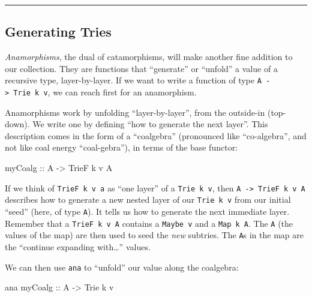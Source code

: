 \documentclass[]{article}
\newenvironment{Shaded}{}{}
\newcommand{\DataTypeTok}[1]{\textcolor[rgb]{0.56,0.13,0.00}{#1}}
\newcommand{\NormalTok}[1]{#1}
\newcommand{\OtherTok}[1]{\textcolor[rgb]{0.00,0.44,0.13}{#1}}
\begin{document}
\begin{center}\rule{0.5\linewidth}{\linethickness}\end{center}

\hypertarget{generating-tries}{%
\subsection{Generating Tries}\label{generating-tries}}

\emph{Anamorphisms}, the dual of catamorphisms, will make another fine addition
to our collection. They are functions that ``generate'' or ``unfold'' a value of
a recursive type, layer-by-layer. If we want to write a function of type
\texttt{A\ -\textgreater{}\ Trie\ k\ v}, we can reach first for an anamorphism.

Anamorphisms work by unfolding ``layer-by-layer'', from the outside-in
(top-down). We write one by defining ``how to generate the next layer''. This
description comes in the form of a ``coalgebra'' (pronounced like
``co-algebra'', and not like coal energy ``coal-gebra''), in terms of the base
functor:

\begin{Shaded}
\begin{Highlighting}[]
\OtherTok{myCoalg ::} \DataTypeTok{A} \OtherTok{->} \DataTypeTok{TrieF}\NormalTok{ k v }\DataTypeTok{A}
\end{Highlighting}
\end{Shaded}

If we think of \texttt{TrieF\ k\ v\ a} as ``one layer'' of a
\texttt{Trie\ k\ v}, then \texttt{A\ -\textgreater{}\ TrieF\ k\ v\ A} describes
how to generate a new nested layer of our \texttt{Trie\ k\ v} from our initial
``seed'' (here, of type \texttt{A}). It tells us how to generate the next
immediate layer. Remember that a \texttt{TrieF\ k\ v\ A} contains a
\texttt{Maybe\ v} and a \texttt{Map\ k\ A}. The \texttt{A} (the values of the
map) are then used to seed the \emph{new} subtries. The \texttt{A}s in the map
are the ``continue expanding with\ldots{}'' values.

We can then use \texttt{ana} to ``unfold'' our value along the coalgebra:

\begin{Shaded}
\begin{Highlighting}[]
\NormalTok{ana}\OtherTok{ myCoalg ::} \DataTypeTok{A} \OtherTok{->} \DataTypeTok{Trie}\NormalTok{ k v}
\end{Highlighting}
\end{Shaded}
\end{document}

